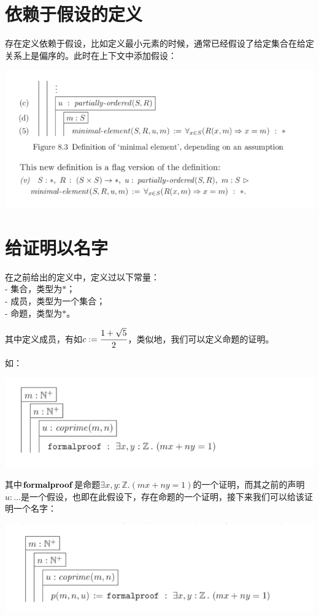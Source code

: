 \documentclass[UTF8]{article}
\begin{document}
	\section{依赖于假设的定义}
	\noindent
	存在定义依赖于假设，比如定义最小元素的时候，通常已经假设了给定集合在给定关系上是偏序的。此时在上下文中添加假设：
	
		\noindent
		\includegraphics[width=0.93\linewidth]{"../imgs/8-1.png"}
	
	\section{给证明以名字}
	\noindent
	在之前给出的定义中，定义过以下常量：\\
	- 集合，类型为$*$；\\
	- 成员，类型为一个集合；\\
	- 命题，类型为$*$。
	
		其中定义成员，有如$c:=\cfrac{1+\sqrt{5}}{2}$，类似地，我们可以定义命题的证明。
		
		如：
		
		\noindent
		\includegraphics[width=0.93\linewidth]{"../imgs/8-2.png"}
		
		其中$\bf formalproof$是命题$\exists x,y:\mathbb{Z}.(mx+ny=1)$的一个证明，而其之前的声明$u:...$是一个假设，也即在此假设下，存在命题的一个证明，接下来我们可以给该证明一个名字：
		
		\noindent
		\includegraphics[width=0.93\linewidth]{"../imgs/8-3.png"}
		
\end{document}
